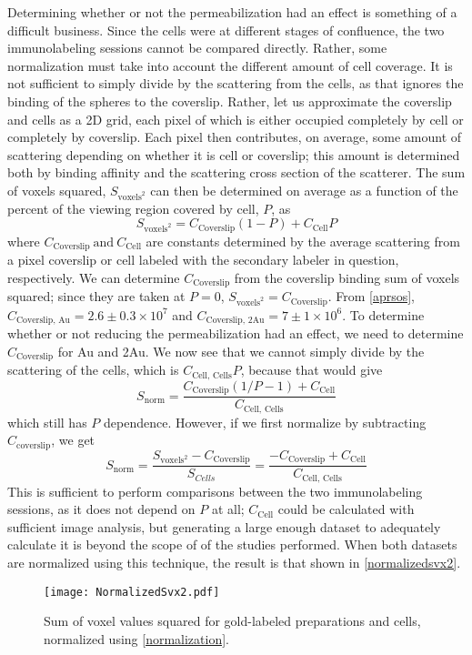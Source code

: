 Determining whether or not the permeabilization had an effect is something of a difficult business. Since the cells were at different stages of confluence, the two immunolabeling sessions cannot be compared directly. Rather, some normalization must take into account the different amount of cell coverage. It is not sufficient to simply divide by the scattering from the cells, as that ignores the binding of the spheres to the coverslip. Rather, let us approximate the coverslip and cells as a 2D grid, each pixel of which is either occupied completely by cell or completely by coverslip. Each pixel then contributes, on average, some amount of scattering depending on whether it is cell or coverslip; this amount is determined both by binding affinity and the scattering cross section of the scatterer. The sum of voxels squared, $S_{\mathrm{voxels}^2}$ can then be determined on average as a function of the percent of the viewing region covered by cell, $P$, as
\[S_{\mathrm{voxels}^2}=C_{\mathrm{Coverslip}}(1-P)+C_{\mathrm{Cell}}P\]
where $C_{\mathrm{Coverslip}}\mathrm{\ and\ }C_{\mathrm{Cell}}$ are constants determined by the average scattering from a pixel coverslip or cell labeled with the secondary labeler in question, respectively. We can determine $C_{\mathrm{Coverslip}}$ from the coverslip binding sum of voxels squared; since they are taken at $P=0$, $S_{\mathrm{voxels}^2}=C_{\mathrm{Coverslip}}$. From \autoref{aprsos}, $C_{\mathrm{Coverslip,\,Au}}=2.6\pm0.3\times10^7$ and $C_{\mathrm{Coverslip,\,2Au}}=7\pm1\times10^6$. To determine whether or not reducing the permeabilization had an effect, we need to determine $C_{\mathrm{Coverslip}}$ for Au and 2Au. We now see that we cannot simply divide by the scattering of the cells, which is $C_{\mathrm{Cell,\,Cells}}P$, because that would give
\[S_{\mathrm{norm}}=\frac{C_{\mathrm{Coverslip}}(1/P-1)+C_{\mathrm{Cell}}}{C_{\mathrm{Cell,\,Cells}}}\]
which still has $P$ dependence. However, if we first normalize by subtracting $C_{\mathrm{coverslip}}$, we get
\begin{equation}
S_{\mathrm{norm}}=\frac{S_{\mathrm{voxels}^2}-C_{\mathrm{Coverslip}}}{S_{Cells}}=\frac{-C_{\mathrm{Coverslip}}+C_{\mathrm{Cell}}}{C_{\mathrm{Cell,\,Cells}}}
\label{eq:normalization}
\end{equation}
This is sufficient to perform comparisons between the two immunolabeling sessions, as it does not depend on $P$ at all; $C_{\mathrm{Cell}}$ could be calculated with sufficient image analysis, but generating a large enough dataset to adequately calculate it is beyond the scope of of the studies performed. When both datasets are normalized using this technique, the result is that shown in \autoref{normalizedsvx2}.

\begin{figure}[htbp]
\centering
\texttt{[image: NormalizedSvx2.pdf]}
\caption{Sum of voxel values squared for gold-labeled preparations and cells, normalized using \autoref{normalization}.}
\label{normalizedsvx2}
\end{figure}

